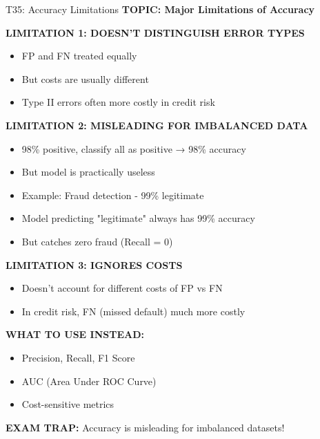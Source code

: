 \documentclass[8pt]{beamer}
\begin{document}
	\begin{frame}{T35: Accuracy Limitations}
		\fontsize{6.5}{7.5}\selectfont
		\textbf{TOPIC: Major Limitations of Accuracy}
		
		\vspace{0.1cm}
		\textbf{LIMITATION 1: DOESN'T DISTINGUISH ERROR TYPES}
		\begin{itemize}
			\item FP and FN treated equally
			\item But costs are usually different
			\item Type II errors often more costly in credit risk
		\end{itemize}
		
		\vspace{0.1cm}
		\textbf{LIMITATION 2: MISLEADING FOR IMBALANCED DATA}
		\begin{itemize}
			\item 98\% positive, classify all as positive → 98\% accuracy
			\item But model is practically useless
			\item Example: Fraud detection - 99\% legitimate
			\item Model predicting "legitimate" always has 99\% accuracy
			\item But catches zero fraud (Recall = 0)
		\end{itemize}
		
		\vspace{0.1cm}
		\textbf{LIMITATION 3: IGNORES COSTS}
		\begin{itemize}
			\item Doesn't account for different costs of FP vs FN
			\item In credit risk, FN (missed default) much more costly
		\end{itemize}
		
		\vspace{0.1cm}
		\textbf{WHAT TO USE INSTEAD:}
		\begin{itemize}
			\item Precision, Recall, F1 Score
			\item AUC (Area Under ROC Curve)
			\item Cost-sensitive metrics
		\end{itemize}
		
		\textcolor{myred}{\textbf{EXAM TRAP:}} Accuracy is \textcolor{myblue}{misleading for imbalanced datasets}!
	\end{frame}
	
\end{document}
